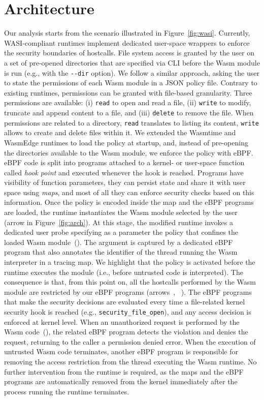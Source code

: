 \section{Architecture}\label{design}

Our analysis starts from the scenario illustrated in
Figure~\ref{fig:wasi}. Currently, WASI-compliant runtimes
implement dedicated user-space wrappers to enforce the
security boundaries of hostcalls. File system access is granted by the
user on a set of pre-opened directories that are specified via CLI
before the Wasm module is run (e.g., with the {\tt -{}-dir} option).
We follow a similar approach, asking the user to state the permissions
of each Wasm module in a JSON policy file. Contrary to existing
runtimes, permissions can be granted with file-based granularity.
Three permissions are available: (i) {\tt read} to open and read a
file, (ii) {\tt write} to modify, truncate and append content to a
file, and (iii) {\tt delete} to remove the file. When permissions are
related to a directory, {\tt read} translates to listing its content,
{\tt write} allows to create and delete files within it. We extended the Wasmtime
and WasmEdge runtimes to load the policy at startup, and, instead of
pre-opening the directories available to the Wasm module, we enforce
the policy with eBPF. eBPF code is split into programs attached to a
kernel- or user-space function called {\em hook point} and executed
whenever the hook is reached. Programs have visibility of function
parameters, they can persist state and share it with user space using
{\em maps}, and most of all they can enforce security checks based on
this information. Once the policy is encoded inside the map and the
eBPF programs are loaded, the runtime instantiates the
Wasm module selected by the user (arrow  in
Figure~\ref{fig:arch}). At this stage, the modified runtime invokes
a dedicated user probe specifying as a parameter the policy
that confines the loaded Wasm module~(). The argument
is captured by a dedicated eBPF program that also annotates the
identifier of the thread running the Wasm interpreter in a tracing
map. We highlight that the policy is activated before the runtime
executes the module (i.e., before untrusted code is interpreted).
The consequence is that, from this point on, all the hostcalls
performed by the Wasm module are restricted by our eBPF programs
(arrows~, ~). The eBPF programs that make the
security decisions are evaluated every time a file-related kernel
security hook is reached (e.g., {\tt security\_file\_open}), and any
access decision is enforced at kernel level. When an unauthorized
request is performed by the Wasm code~(), the related
eBPF program detects the violation and denies the request, returning
to the caller a permission denied error. When the execution of untrusted 
Wasm code terminates, another eBPF program is responsible for 
removing the access restriction from the thread executing the Wasm
runtime. No further intervention from the runtime is required, as the
maps and the eBPF programs are automatically removed from the kernel
immediately after the process running the runtime terminates.

